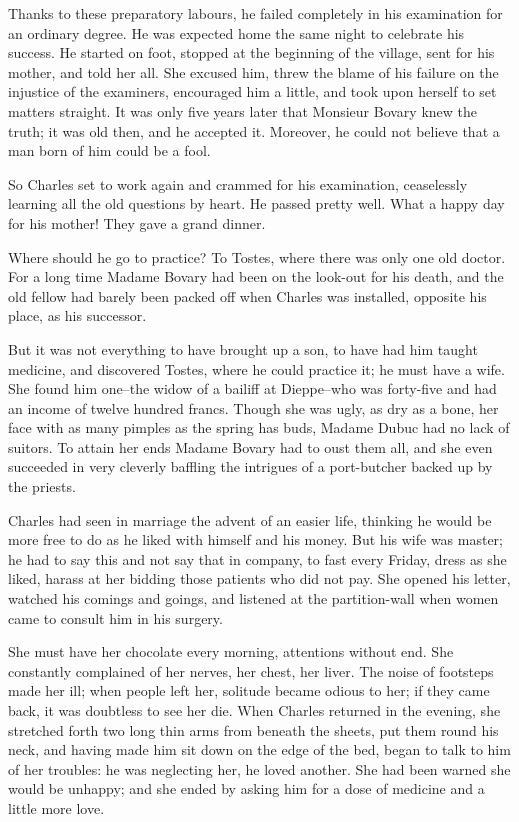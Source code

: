 \documentclass{tufte-book}
\begin{document}
Thanks to these preparatory labours, he failed completely in his
examination for an ordinary degree. He was expected home the same night
to celebrate his success. He started on foot, stopped at the beginning
of the village, sent for his mother, and told her all. She excused
him, threw the blame of his failure on the injustice of the examiners,
encouraged him a little, and took upon herself to set matters straight.
It was only five years later that Monsieur Bovary knew the truth; it was
old then, and he accepted it. Moreover, he could not believe that a man
born of him could be a fool.

So Charles set to work again and crammed for his examination,
ceaselessly learning all the old questions by heart. He passed pretty
well. What a happy day for his mother! They gave a grand dinner.

Where should he go to practice? To Tostes, where there was only one old
doctor. For a long time Madame Bovary had been on the look-out for his
death, and the old fellow had barely been packed off when Charles was
installed, opposite his place, as his successor.

But it was not everything to have brought up a son, to have had him
taught medicine, and discovered Tostes, where he could practice it;
he must have a wife. She found him one--the widow of a bailiff at
Dieppe--who was forty-five and had an income of twelve hundred francs.
Though she was ugly, as dry as a bone, her face with as many pimples as
the spring has buds, Madame Dubuc had no lack of suitors. To attain her
ends Madame Bovary had to oust them all, and she even succeeded in
very cleverly baffling the intrigues of a port-butcher backed up by the
priests.

Charles had seen in marriage the advent of an easier life, thinking he
would be more free to do as he liked with himself and his money. But his
wife was master; he had to say this and not say that in company, to fast
every Friday, dress as she liked, harass at her bidding those patients
who did not pay. She opened his letter, watched his comings and goings,
and listened at the partition-wall when women came to consult him in his
surgery.

She must have her chocolate every morning, attentions without end. She
constantly complained of her nerves, her chest, her liver. The noise of
footsteps made her ill; when people left her, solitude became odious to
her; if they came back, it was doubtless to see her die. When Charles
returned in the evening, she stretched forth two long thin arms from
beneath the sheets, put them round his neck, and having made him sit
down on the edge of the bed, began to talk to him of her troubles: he
was neglecting her, he loved another. She had been warned she would be
unhappy; and she ended by asking him for a dose of medicine and a little
more love.
\end{document}
